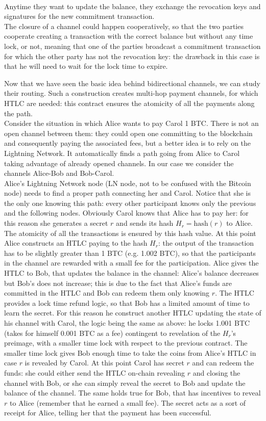 \\
Anytime they want to update the balance, they exchange the revocation keys and signatures for the new commitment transaction.
\\
The closure of a channel could happen cooperatively, so that the two parties cooperate creating a transaction with the correct balance but without any time lock, or not, meaning that one of the parties broadcast a commitment transaction for which the other party has not the revocation key: the drawback in this case is that he will need to wait for the lock time to expire.  

\bigskip
\noindent
Now that we have seen the basic idea behind bidirectional channels, we can study their routing. Such a construction creates multi-hop payment channels, for which HTLC are needed: this contract ensures the atomicity of all the payments along the path.
\\
Consider the situation in which Alice wants to pay Carol 1 BTC. There is not an open channel between them: they could open one committing to the blockchain and consequently paying the associated fees, but a better idea is to rely on the Lightning Network. It automatically finds a path going from Alice to Carol taking advantage of already opened channels. In our case we consider the channels Alice-Bob and Bob-Carol.
\\
Alice's Lightning Network node (LN node, not to be confused with the Bitcoin node) needs to find a proper path connecting her and Carol. Notice that she is the only one knowing this path: every other participant knows only the previous and the following nodes. Obviously Carol knows that Alice has to pay her: for this reason she generates a secret $r$ and sends its hash $H_r = \text{hash}(r)$ to Alice. The atomicity of all the transactions is ensured by this hash value. At this point Alice constructs an HTLC paying to the hash $H_r$: the output of the transaction has to be slightly greater than 1 BTC (e.g. 1.002 BTC), so that the participants in the channel are rewarded with a small fee for the participation. Alice gives the HTLC to Bob, that updates the balance in the channel: Alice's balance decreases but Bob's does not increase; this is due to the fact that Alice's funds are committed in the HTLC and Bob can redeem them only knowing $r$. The HTLC provides a lock time refund logic, so that Bob has a limited amount of time to learn the secret. For this reason he construct another HTLC updating the state of his channel with Carol, the logic being the same as above: he locks 1.001 BTC (takes for himself 0.001 BTC as a fee) contingent to revelation of the $H_r$'s preimage, with a smaller time lock with respect to the previous contract. The smaller time lock gives Bob enough time to take the coins from Alice's HTLC in case $r$ is revealed by Carol. At this point Carol has secret $r$ and can redeem the funds: she could either send the HTLC on-chain revealing $r$ and closing the channel with Bob, or she can simply reveal the secret to Bob and update the balance of the channel. The same holds true for Bob, that has incentives to reveal $r$ to Alice (remember that he earned a small fee). The secret acts as a sort of receipt for Alice, telling her that the payment has been successful.


